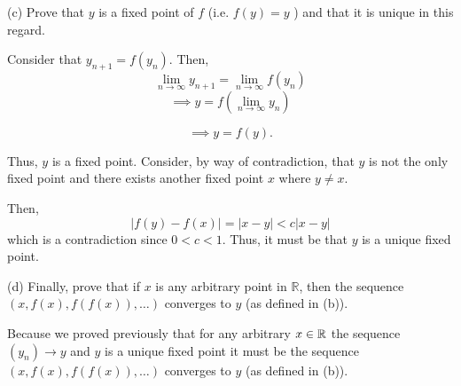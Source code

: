 \documentclass{report}
\begin{document}
\par
\bigskip
(c) Prove that $y$ is a fixed point of $f$ (i.e. $f(y)=y$ ) and that it is unique in this regard.

\par

\begin{myproof}
    
\bigskip
Consider that $y_{n+1} = f(y_n).$ Then, $$ \lim_{n \rightarrow \infty} y_{n+1} = \lim_{n \rightarrow \infty}f(y_n)$$
$$\implies y=  f\left(\lim_{n \rightarrow \infty}y_n\right)$$

$$\implies  y = f(y).$$

Thus, $y$ is a fixed point. Consider, by way of contradiction, that $y$ is not the only fixed point and there exists another fixed point $x$ where $y\not=x.$

Then, $$|f(y) - f(x)| = |x-y| < c|x-y|$$ which is a contradiction since $0 < c < 1$. Thus, it must be that $y$ is a unique fixed point.

\end{myproof}
\bigskip
(d) Finally, prove that if $x$ is any arbitrary point in $\mathbb{R}$, then the sequence $(x, f(x), f(f(x)), \ldots)$ converges to $y$ (as defined in (b)).

\begin{myproof}
Because we proved previously that for any arbitrary $x \in \RR$ the sequence $(y_n) \rightarrow y$ and $y$ is a unique fixed point it must be the sequence $(x, f(x), f(f(x)), \ldots)$ converges to $y$ (as defined in (b)).
\end{myproof}

\pagebreak
{}
\end{document}
